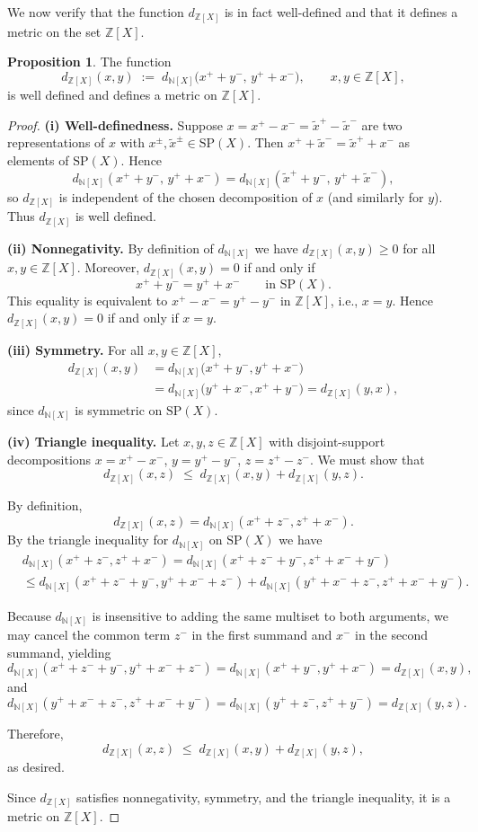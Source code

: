 \documentclass[10pt,a4paper]{article}
\theoremstyle{definition}
\newtheorem{proposition}[theorem]{Proposition}
\newcommand{\SP}{\mathrm{SP}}
\newcommand{\Z}{\mathbb{Z}}
\newcommand{\N}{\mathbb{N}}
\begin{document}
We now verify that the function $d_{\Z[X]}$ is in fact well-defined and that it defines a metric on the set $\Z[X]$.
\begin{proposition}\label{prop:Z[X]_metric}
The function
\[
d_{\Z[X]}(x,y)\;:=\; d_{\N[X]}\!\bigl(x^{+}+y^{-},\, y^{+}+x^{-}\bigr),
\qquad x,y\in \Z[X],
\]
is well defined and defines a metric on $\Z[X]$.
\end{proposition}
\begin{proof}
\noindent\textbf{(i) Well-definedness.}
Suppose $x = x^{+}-x^{-} = \tilde{x}^{+}-\tilde{x}^{-}$ are two
representations of $x$ with $x^{\pm},\tilde{x}^{\pm}\in \SP(X)$.
Then $x^{+}+\tilde{x}^{-} = \tilde{x}^{+}+x^{-}$ as elements of $\SP(X)$.
Hence
\[
d_{\N[X]}(x^{+}+y^{-},\, y^{+}+x^{-})
= d_{\N[X]}(\tilde{x}^{+}+y^{-},\, y^{+}+\tilde{x}^{-}),
\]
so $d_{\Z[X]}$ is independent of the chosen decomposition of $x$ (and similarly
for $y$). Thus $d_{\Z[X]}$ is well defined.

\smallskip
\noindent\textbf{(ii) Nonnegativity.}
By definition of $d_{\N[X]}$ we have $d_{\Z[X]}(x,y)\ge 0$ for all $x,y\in \Z[X]$.
Moreover, $d_{\Z[X]}(x,y)=0$ if and only if
\[
x^{+}+y^{-} = y^{+}+x^{-}
\qquad \text{in } \SP(X).
\]
This equality is equivalent to $x^{+}-x^{-}=y^{+}-y^{-}$ in $\Z[X]$, i.e.,
$x=y$. Hence $d_{\Z[X]}(x,y)=0$ if and only if $x=y$.

\smallskip
\noindent\textbf{(iii) Symmetry.}
For all $x,y\in \Z[X]$,
\begin{align*}
d_{\Z[X]}(x,y)
&= d_{\N[X]}\!\bigl(x^{+}+y^{-},y^{+}+x^{-}\bigr) \\
&= d_{\N[X]}\!\bigl(y^{+}+x^{-},x^{+}+y^{-}\bigr)
= d_{\Z[X]}(y,x),
\end{align*}
since $d_{\N[X]}$ is symmetric on $\SP(X)$.

\smallskip
\noindent\textbf{(iv) Triangle inequality.}
Let $x,y,z \in \Z[X]$ with disjoint-support decompositions
$x = x^+ - x^-$, $y = y^+ - y^-$, $z = z^+ - z^-$. 
We must show that
\[
d_{\Z[X]}(x,z) \;\le\; d_{\Z[X]}(x,y) + d_{\Z[X]}(y,z).
\]

By definition,
\[
d_{\Z[X]}(x,z) = d_{\N[X]}(x^+ + z^-, z^+ + x^-).
\]
By the triangle inequality for $d_{\N[X]}$ on $\SP(X)$ we have
\begin{align*}
&d_{\N[X]}(x^+ + z^-, z^+ + x^-)=d_{\N[X]}(x^+ + z^- + y^-, z^+ + x^- + y^-)
\\ &\leq 
d_{\N[X]}(x^+ + z^- + y^-, y^+ + x^- + z^-) + d_{\N[X]}(y^+ + x^- + z^-, z^+ + x^- + y^-).
\end{align*}

Because $d_{\N[X]}$ is insensitive to adding the same multiset to both arguments,
we may cancel the common term $z^-$ in the first summand and $x^-$ in the
second summand, yielding
\[
d_{\N[X]}(x^+ + z^- + y^-, y^+ + x^- + z^-) = d_{\N[X]}(x^+ + y^-, y^+ + x^-)
= d_{\Z[X]}(x,y),
\]
and
\[
d_{\N[X]}(y^+ + x^- + z^-, z^+ + x^- + y^-) = d_{\N[X]}(y^+ + z^-, z^+ + y^-)
= d_{\Z[X]}(y,z).
\]

Therefore,
\[
d_{\Z[X]}(x,z) \;\le\; d_{\Z[X]}(x,y) + d_{\Z[X]}(y,z),
\]
as desired.

\smallskip
Since $d_{\Z[X]}$ satisfies nonnegativity, symmetry, and the triangle inequality, it is a metric on $\Z[X]$.
\end{proof}
\end{document}
